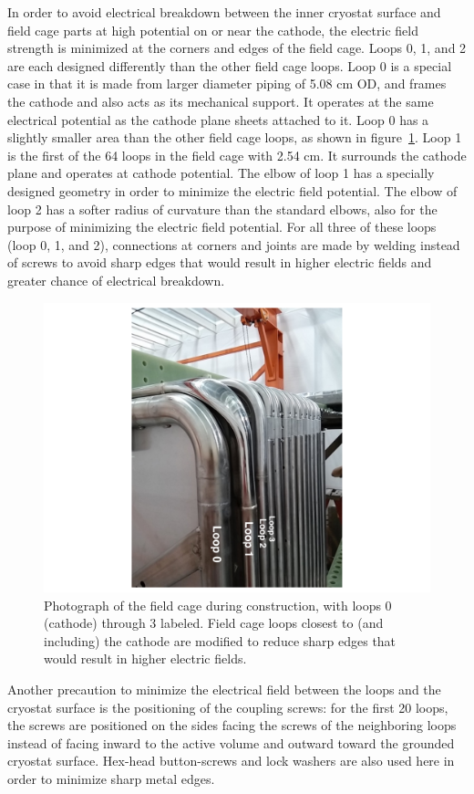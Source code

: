 In order to avoid electrical breakdown between the inner cryostat surface and field cage parts at high potential on or near the cathode, the electric field strength is minimized at the corners and edges of the field cage. Loops 0, 1, and 2 are each designed differently than the other field cage loops.  Loop 0 is a special case in that it is made from larger diameter piping of 5.08 cm OD, and frames the cathode and also acts as its mechanical support.  It operates at the same electrical potential as the cathode plane sheets attached to it.  Loop 0 has a slightly smaller area than the other field cage loops, as shown in figure~\ref{fig:tpc-smooshed-elbow}.  Loop 1 is the first of the 64 loops in the field cage with 2.54 cm.  It surrounds the cathode plane and operates at cathode potential.  The elbow of loop 1 has a specially designed geometry in order to minimize the electric field potential.  The elbow of loop 2 has a softer radius of curvature than the standard elbows, also for the purpose of minimizing the electric field potential. For all three of these loops (loop 0, 1, and 2), connections at corners and joints are made by welding instead of screws to avoid sharp edges that would result in higher electric fields and greater chance of electrical breakdown.

\begin{figure}
\centering	
\includegraphics[width=0.7\linewidth]{figures/tpc-fieldcage-loops}
\caption{Photograph of the field cage during construction, with loops 0 (cathode) through 3 labeled.  Field cage loops closest to (and including) the cathode are modified to reduce sharp edges that would result in higher electric fields.}
\label{fig:tpc-smooshed-elbow}
\end{figure}

Another precaution to minimize the electrical field between the loops and the cryostat surface is the positioning of the coupling screws: for the first 20 loops, the screws are positioned on the sides facing the screws of the neighboring loops instead of facing inward to the \lartpc active volume and outward toward the grounded cryostat surface. Hex-head button-screws and lock washers are also used here in order to minimize sharp metal edges.

